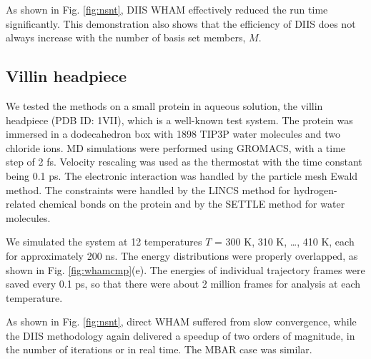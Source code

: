 \documentclass[reprint,aip,jcp,superscriptaddress]{revtex4-1}
\begin{document}
As shown in Fig. \ref{fig:nsnt},
DIIS WHAM effectively
reduced the run time significantly.
%
This demonstration also shows that
the efficiency of DIIS does not
always increase with
the number of basis set members, $M$.




\subsection{\label{sec:results_villin}
Villin headpiece}



We tested the methods on a small protein in aqueous solution,
the villin headpiece
(PDB ID: 1VII), which is a well-known test system\cite{duan1998}.
%
The protein was immersed in
a dodecahedron box with 1898 TIP3P water molecules and two chloride ions.
%
MD simulations were performed
using GROMACS\cite{
berendsen1995, *lindahl2001, *vanderspoel2005, *hess2008},
with a time step of 2 fs.
%
Velocity rescaling\cite{bussi2007}
was used as the thermostat with
the time constant being 0.1 ps.
%
The electronic interaction was
handled by the particle mesh Ewald method\cite{
essmann1995}.
%
The constraints were handled by the LINCS method\cite{
hess1997}
for hydrogen-related chemical bonds on the protein
and by the SETTLE method\cite{
miyamoto1992}
for water molecules.
%



We simulated the system at 12 temperatures
$T$ = 300 K, 310 K, \dots, 410 K,
each for approximately 200 ns.
%
The energy distributions were properly overlapped,
as shown in Fig. \ref{fig:whamcmp}(e).
%
The energies of individual trajectory frames were saved every 0.1 ps,
so that there were about 2 million frames for analysis
at each temperature.



As shown in Fig. \ref{fig:nsnt},
direct WHAM suffered from slow convergence,
while the DIIS methodology again
delivered a speedup of two orders of magnitude,
in the number of iterations or in real time.
%
The MBAR case was similar.
%
\end{document}
